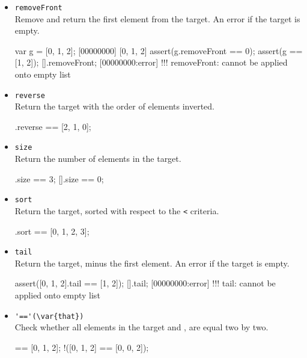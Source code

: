 \begin{itemize}
\item \lstinline|removeFront|\\
Remove and return the first element from the target. An error if the
target is empty.

\begin{urbiscript}[firstnumber=last]
var g = [0, 1, 2];
[00000000] [0, 1, 2]
assert(g.removeFront == 0);
assert(g == [1, 2]);
[].removeFront;
[00000000:error] !!! removeFront: cannot be applied onto empty list
\end{urbiscript}

\item \lstinline|reverse|\\
Return the target with the order of elements inverted.

\begin{urbiassert}[firstnumber=last]
[0, 1, 2].reverse == [2, 1, 0];
\end{urbiassert}

\item \lstinline|size|\\
Return the number of elements in the target.

\begin{urbiassert}[firstnumber=last]
[0, 1, 2].size == 3;
[].size == 0;
\end{urbiassert}

\item \lstinline|sort|\\
Return the target, sorted with respect to the \lstinline|<| criteria.

\begin{urbiassert}[firstnumber=last]
[1, 0, 3, 2].sort == [0, 1, 2, 3];
\end{urbiassert}

\item \lstinline|tail|\\
Return the target, minus the first element. An error if the target is
empty.

\begin{urbiscript}[firstnumber=last]
assert([0, 1, 2].tail == [1, 2]);
[].tail;
[00000000:error] !!! tail: cannot be applied onto empty list
\end{urbiscript}

\item \lstinline|'=='(\var{that})|\\
Check whether all elements in the target and , are
equal two by two.

\begin{urbiassert}[firstnumber=last]
[0, 1, 2] == [0, 1, 2];
!([0, 1, 2] == [0, 0, 2]);
\end{urbiassert}


\end{itemize}
